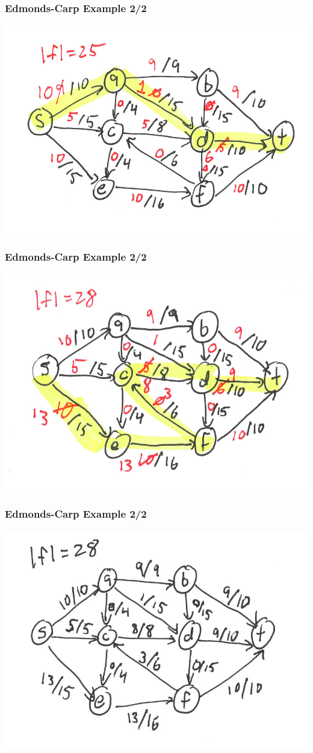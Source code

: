 \documentclass{beamer}
\begin{document}
\begin{frame} \frametitle{Edmonds-Carp Example 2/2}
\begin{center}
  \includegraphics[scale=1]{ek-2-5.png}
\end{center}
\end{frame}

\begin{frame} \frametitle{Edmonds-Carp Example 2/2}
\begin{center}
  \includegraphics[scale=1]{ek-2-6.png}
\end{center}
\end{frame}

\begin{frame} \frametitle{Edmonds-Carp Example 2/2}
\begin{center}
  \includegraphics[scale=1]{ek-2-7.png}
\end{center}
\end{frame}
\end{document}
